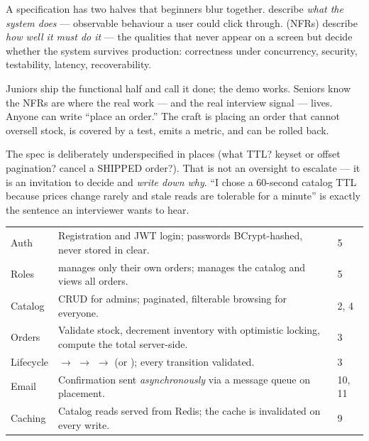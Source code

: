 

 A specification has two halves that beginners blur together.  describe \emph{what the system does} --- observable behaviour a user could click through.  (NFRs) describe \emph{how well it must do it} --- the qualities that never appear on a screen but decide whether the system survives production: correctness under concurrency, security, testability, latency, recoverability.

 Juniors ship the functional half and call it done; the demo works. Seniors know the NFRs are where the real work --- and the real interview signal --- lives. Anyone can write ``place an order.'' The craft is placing an order that cannot oversell stock, is covered by a test, emits a metric, and can be rolled back.

 The spec is deliberately underspecified in places (what TTL? keyset or offset pagination? cancel a SHIPPED order?). That is not an oversight to escalate --- it is an invitation to decide and \emph{write down why}. ``I chose a 60-second catalog TTL because prices change rarely and stale reads are tolerable for a minute'' is exactly the sentence an interviewer wants to hear.


\begin{center}\small
\begin{tabularx}{\linewidth}{@{}L{22mm} X C{9mm}@{}}
 &  & \\\midrule
Auth & Registration and JWT login; passwords BCrypt-hashed, never stored in clear. & 5\\
Roles &  manages only their own orders;  manages the catalog and views all orders. & 5\\
Catalog & CRUD for admins; paginated, filterable browsing for everyone. & 2, 4\\
Orders & Validate stock, decrement inventory with optimistic locking, compute the total server-side. & 3\\
Lifecycle &  $\rightarrow$  $\rightarrow$  $\rightarrow$  (or ); every transition validated. & 3\\
Email & Confirmation sent \emph{asynchronously} via a message queue on placement. & 10, 11\\
Caching & Catalog reads served from Redis; the cache is invalidated on every write. & 9\\
\end{tabularx}\end{center}

